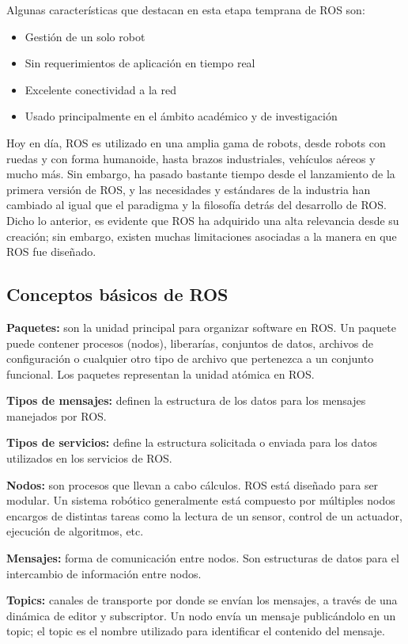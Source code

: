 Algunas características que destacan en esta etapa temprana de ROS son:
\begin{itemize}
    \item Gestión de un solo robot
    \item Sin requerimientos de aplicación en tiempo real
    \item Excelente conectividad a la red
    \item Usado principalmente en el ámbito académico y de investigación
\end{itemize}

Hoy en día, ROS es utilizado en una amplia gama de robots, desde robots con ruedas y con forma humanoide, hasta brazos industriales, vehículos aéreos y mucho más. Sin embargo, ha pasado bastante tiempo desde el lanzamiento de la primera versión de ROS, y las necesidades y estándares de la industria han cambiado al igual que el paradigma y la filosofía detrás del desarrollo de ROS. Dicho lo anterior, es evidente que ROS ha adquirido una alta relevancia desde su creación; sin embargo, existen muchas limitaciones asociadas a la manera en que ROS fue diseñado. 

\subsection{Conceptos básicos de ROS}

\textbf{Paquetes:} son la unidad principal para organizar software en ROS. Un paquete puede contener procesos (nodos), liberarías, conjuntos de datos, archivos de configuración o cualquier otro tipo de archivo que pertenezca a un conjunto funcional.  Los paquetes representan la unidad atómica en ROS.

\textbf{Tipos de mensajes:} definen la estructura de los datos para los mensajes manejados por ROS.

\textbf{Tipos de servicios:} define la estructura solicitada o enviada para los datos utilizados en los servicios de ROS.

\textbf{Nodos:} son procesos que llevan a cabo cálculos. ROS está diseñado para ser modular. Un sistema robótico generalmente está compuesto por múltiples nodos encargos de distintas tareas como la lectura de un sensor, control de un actuador, ejecución de algoritmos, etc.

\textbf{Mensajes:} forma de comunicación entre nodos. Son estructuras de datos para el intercambio de información entre nodos.

\textbf{Topics:} canales de transporte por donde se envían los mensajes, a través de una dinámica de editor y subscriptor. Un nodo envía un mensaje publicándolo en un topic; el topic es el nombre utilizado para identificar el contenido del mensaje.

